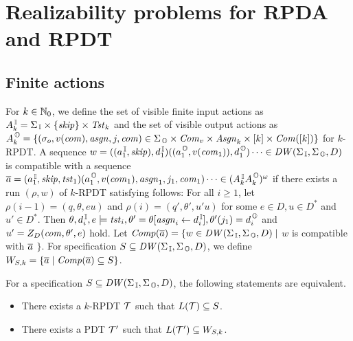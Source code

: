 \section{Realizability problems for RPDA and RPDT}
\subsection{Finite actions}
For $k\in\mathbb{N}_0$,
we define the set of visible finite input actions as $A_k^{\, \mathbb{I}} = \Sigma_{\, \mathbb{I}}\times\{\mathit{skip}\}\times \mathit{Tst}_k$
and the set of visible output actions as $A_k^{\, \mathbb{O}} = \{(\sigma_o, v(\mathit{com}), \mathit{asgn}, j, \mathit{com})\in \Sigma_{\, \mathbb{O}}\times\mathit{Com}_v\times \mathit{Asgn}_k\times [k]\times \mathit{Com}([k])\}$ for $k$-RPDT.
A sequence $w = ((a^{\, \mathbb{I}}_1, \mathit{skip}),d^{\, \mathbb{I}}_1) ((a^{\, \mathbb{O}}_1,v(\mathit{com}_1)),d^{\, \mathbb{O}}_1)\cdots \in \mathit{DW}(\Sigma_{\, \mathbb{I}},\Sigma_{\, \mathbb{O}},D)$ is compatible with a sequence
$\overline{a} = (a^{\, \mathbb{I}}_1, \mathit{skip},\mathit{tst}_1)(a^{\, \mathbb{O}}_1,v(\mathit{com}_1),\mathit{asgn}_1,j_1, \mathit{com}_1)\cdots \in (A_k^{\, \mathbb{I}} A_k^{\, \mathbb{O}})^\omega$
if there exists a run $(\rho, w)$ of $k$-RPDT satisfying follows:
For all $i\geq 1$, let $\rho(i-1)=(q,\theta,eu)$ and $\rho(i)=(q',\theta',u'u)$
for some $e\in D, u\in D^*$ and $u'\in D^*$.
Then $\theta, d^{\, \mathbb{I}}_i, e\models \mathit{tst}_i, \theta'=\theta[\mathit{asgn}_i\leftarrow d^{\, \mathbb{I}}_i], \theta'(j_1) = d^{\, \mathbb{O}}_i$ and $u'=Z_D(\mathit{com},\theta',e)$ hold.
Let ${\mathit{Comp}}(\overline{a}) = \{w\in \mathit{DW}(\Sigma_{\, \mathbb{I}},\Sigma_{\, \mathbb{O}},D)\mid$ $w$ is compatible with $\overline{a}$ $\}$.
For specification $S \subseteq \mathit{DW}(\Sigma_{\, \mathbb{I}},\Sigma_{\, \mathbb{O}},D)$, we define $W_{S,k}=\{\overline{a}\mid {\mathit{Comp}}(\overline{a})\subseteq S\}$.

\begin{theorem}\label{the: finite_actions}
For a specification $S\subseteq \mathit{DW}(\Sigma_{\, \mathbb{I}},\Sigma_{\, \mathbb{O}},D)$, the following statements are equivalent.
\begin{itemize}
\item There exists a $k$-RPDT ${\cal T}$ such that $L({\cal T})\subseteq S$.
\item There exists a PDT ${\cal T}'$ such that $L({\cal T}')\subseteq W_{S,k}$.
\end{itemize}
\end{theorem}


